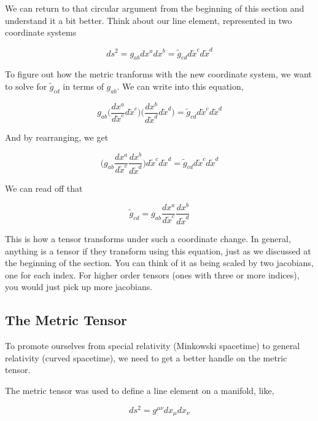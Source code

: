 \documentclass{article}
\begin{document}
We can return to that circular argument from the beginning of this section and understand it a bit better. Think about our line element, represented in two coordinate systems

\begin{equation}
    ds^2 = g_{ab} dx^a dx^b = \tilde{g}_{cd} d\tilde{x}^c d\tilde{x}^d
\end{equation}

To figure out how the metric tranforms with the new coordinate system, we want to solve for $\tilde{g}_{cd}$ in terms of $g_{ab}$. We can write into this equation,

\begin{equation}
    g_{ab} \biggl(\frac{dx^a}{d\tilde{x}^c}d\tilde{x}^c\biggr) \biggl(\frac{dx^b}{d\tilde{x}^d}d\tilde{x}^d\biggr) = \tilde{g}_{cd} d\tilde{x}^c d\tilde{x}^d
\end{equation}

And by rearranging, we get

\begin{equation}
    \biggl(g_{ab} \frac{dx^a}{d\tilde{x}^c} \frac{dx^b}{d\tilde{x}^d} \biggr) d\tilde{x}^c d\tilde{x}^d = \tilde{g}_{cd} d\tilde{x}^c d\tilde{x}^d
\end{equation}

We can read off that

\begin{equation}
    \tilde{g}_{cd} = g_{ab} \frac{dx^a}{d\tilde{x}^c} \frac{dx^b}{d\tilde{x}^d}
\end{equation}

This is how a tensor transforms under such a coordinate change. In general, anything is a tensor if they transform using this equation, just as we discussed at the beginning of the section. You can think of it as being scaled by two jacobians, one for each index. For higher order tensors (ones with three or more indices), you would just pick up more jacobians.

\subsection{The Metric Tensor}
To promote ourselves from special relativity (Minkowski spacetime) to general relativity (curved spacetime), we need to get a better handle on the metric tensor.

The metric tensor was used to define a line element on a manifold, like,

\begin{equation}
    ds^2 = g^{\mu\nu} dx_\mu dx_\nu    
\end{equation}
\end{document}
